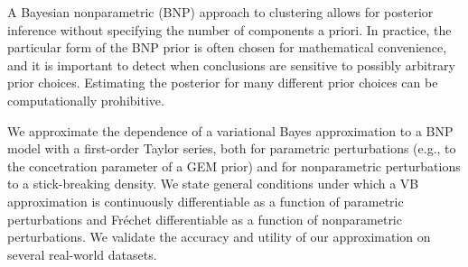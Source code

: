 A Bayesian nonparametric (BNP) approach to clustering allows for posterior
inference without specifying the number of components a priori.  In practice,
the particular form of the BNP prior is often chosen for mathematical
convenience, and it is important to detect when conclusions are sensitive to
possibly arbitrary prior choices.  Estimating the posterior for many
different prior choices can be computationally prohibitive.

We approximate the dependence of a variational Bayes approximation to a BNP
model with a first-order Taylor series, both for parametric perturbations (e.g.,
to the concetration parameter of a GEM prior) and for nonparametric
perturbations to a stick-breaking density. We state general conditions under
which a VB approximation is continuously differentiable as a function of
parametric perturbations and Fr{\'e}chet differentiable as a function of
nonparametric perturbations.  We validate the accuracy and utility of our
approximation on several real-world datasets.
